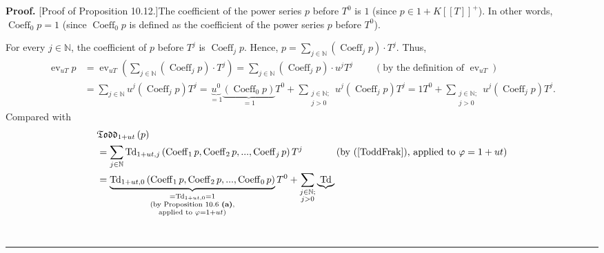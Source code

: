 \documentclass[numbers=enddot,12pt,final,onecolumn,notitlepage]{scrartcl}%
\newenvironment{proof}[1][Proof]{\noindent\textbf{#1.} }{\ \rule{0.5em}{0.5em}}
\begin{document}
\begin{proof}
[Proof of Proposition 10.12.]The coefficient of the power series $p$ before
$T^{0}$ is $1$ (since $p\in1+K\left[  \left[  T\right]  \right]  ^{+}$). In
other words, $\operatorname*{Coeff}\nolimits_{0}p=1$ (since
$\operatorname*{Coeff}\nolimits_{0}p$ is defined as the coefficient of the
power series $p$ before $T^{0}$).

For every $j\in\mathbb{N}$, the coefficient of $p$ before $T^{j}$ is
$\operatorname*{Coeff}\nolimits_{j}p$. Hence, $p=\sum\limits_{j\in\mathbb{N}%
}\left(  \operatorname*{Coeff}\nolimits_{j}p\right)  \cdot T^{j}$. Thus,
\begin{align*}
\operatorname*{ev}\nolimits_{uT}p  &  =\operatorname*{ev}\nolimits_{uT}\left(
\sum\limits_{j\in\mathbb{N}}\left(  \operatorname*{Coeff}\nolimits_{j}%
p\right)  \cdot T^{j}\right)  =\sum\limits_{j\in\mathbb{N}}\left(
\operatorname*{Coeff}\nolimits_{j}p\right)  \cdot u^{j}T^{j}%
\ \ \ \ \ \ \ \ \ \ \left(  \text{by the definition of }\operatorname*{ev}%
\nolimits_{uT}\right) \\
&  =\sum_{j\in\mathbb{N}}u^{j}\left(  \operatorname*{Coeff}\nolimits_{j}%
p\right)  T^{j}=\underbrace{u^{0}}_{=1}\underbrace{\left(
\operatorname*{Coeff}\nolimits_{0}p\right)  }_{=1}T^{0}+\sum_{\substack{j\in
\mathbb{N};\\j>0}}u^{j}\left(  \operatorname*{Coeff}\nolimits_{j}p\right)
T^{j}=1T^{0}+\sum_{\substack{j\in\mathbb{N};\\j>0}}u^{j}\left(
\operatorname*{Coeff}\nolimits_{j}p\right)  T^{j}.
\end{align*}
Compared with%
\begin{align*}
&  \mathfrak{Todd}_{1+ut}\left(  p\right) \\
&  =\sum_{j\in\mathbb{N}}\operatorname*{Td}\nolimits_{1+ut,j}\left(
\operatorname*{Coeff}\nolimits_{1}p,\operatorname*{Coeff}\nolimits_{2}%
p,...,\operatorname*{Coeff}\nolimits_{j}p\right)  T^{j}%
\ \ \ \ \ \ \ \ \ \ \left(  \text{by (\ref{ToddFrak}), applied to }%
\varphi=1+ut\right) \\
&  =\underbrace{\operatorname*{Td}\nolimits_{1+ut,0}\left(
\operatorname*{Coeff}\nolimits_{1}p,\operatorname*{Coeff}\nolimits_{2}%
p,...,\operatorname*{Coeff}\nolimits_{0}p\right)  }%
_{\substack{=\operatorname*{Td}\nolimits_{1+ut,0}=1\\\text{(by Proposition
10.6 \textbf{(a)},}\\\text{applied to }\varphi=1+ut\text{)}}}T^{0}%
+\sum_{\substack{j\in\mathbb{N};\\j>0}}\underbrace{\operatorname*{Td}%
}
\end{align*}
\end{proof}
\end{document}
